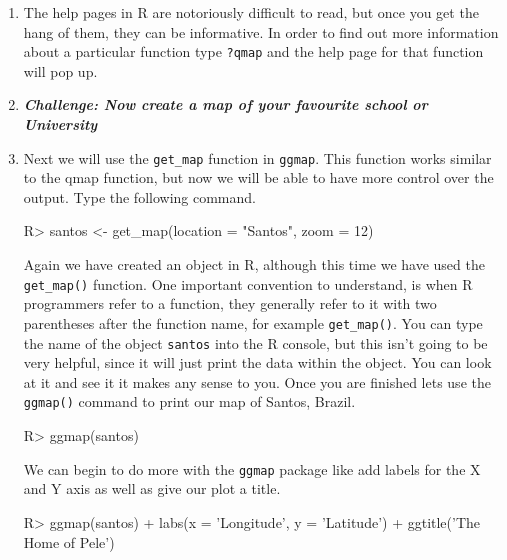 \documentclass{article}
\newenvironment{Schunk}{}{}
\newcommand{\code}[1]{\texttt{#1}}
\newcommand{\pkg}[1]{\mbox{\texttt{#1}}}
\newcommand{\proglang}[1]{\textsf{#1}}
\begin{document}
\begin{enumerate}[leftmargin=15mm]
\item The help pages in \proglang{R} are notoriously difficult to read, but once you get the hang of them, they can be informative.  In order to find out more information about a particular function type \code{?qmap} and the help page for that function will pop up.

\item \textbf{\textit{Challenge:  Now create a map of your favourite school or University}}

\item Next we will use the \code{get\_map} function in \pkg{ggmap}.  This function works similar to the qmap function, but now we will be able to have more control over the output.  Type the following command.

\begin{Schunk}
\begin{Sinput}

R>  santos <- get_map(location = "Santos", zoom = 12)

\end{Sinput}
\end{Schunk}

Again we have created an object in \proglang{R}, although this time we have used the \code{get\_map()} function.  One important convention to understand, is when \proglang{R} programmers refer to a function, they generally refer to it with two parentheses after the function name, for example \code{get\_map()}.  You can type the name of the object \code{santos} into the \proglang{R} console, but this isn't going to be very helpful, since it will just print the data within the object.  You can look at it and see it it makes any sense to you.  Once you are finished lets use the \code{ggmap()} command to print our map of Santos, Brazil.

\begin{Schunk}
\begin{Sinput}

R>  ggmap(santos)

\end{Sinput}
\end{Schunk}

We can begin to do more with the \pkg{ggmap} package like add labels for the X and Y axis as well as give our plot a title.

\begin{Schunk}
\begin{Sinput}

R>  ggmap(santos) + labs(x = 'Longitude', y = 'Latitude') +  
ggtitle('The Home of Pele')


\end{Sinput}
\end{Schunk}
\end{enumerate}
\end{document}
